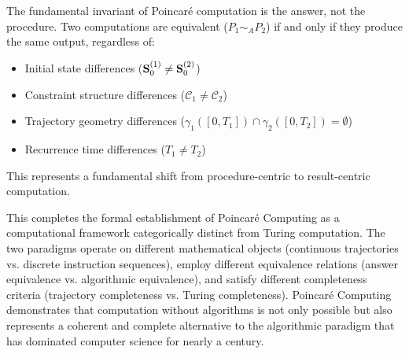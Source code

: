 \begin{proposition}
\label{prop:answer_primacy}
The fundamental invariant of Poincaré computation is the answer, not the procedure. Two computations are equivalent ($P_1 \sim_A P_2$) if and only if they produce the same output, regardless of:
\begin{itemize}
    \item Initial state differences ($\mathbf{S}_0^{(1)} \neq \mathbf{S}_0^{(2)}$)
    \item Constraint structure differences ($\mathcal{C}_1 \neq \mathcal{C}_2$)
    \item Trajectory geometry differences ($\gamma_1([0,T_1]) \cap \gamma_2([0,T_2]) = \emptyset$)
    \item Recurrence time differences ($T_1 \neq T_2$)
\end{itemize}
This represents a fundamental shift from procedure-centric to result-centric computation.
\end{proposition}

This completes the formal establishment of Poincaré Computing as a computational framework categorically distinct from Turing computation. The two paradigms operate on different mathematical objects (continuous trajectories vs. discrete instruction sequences), employ different equivalence relations (answer equivalence vs. algorithmic equivalence), and satisfy different completeness criteria (trajectory completeness vs. Turing completeness). Poincaré Computing demonstrates that computation without algorithms is not only possible but also represents a coherent and complete alternative to the algorithmic paradigm that has dominated computer science for nearly a century.

